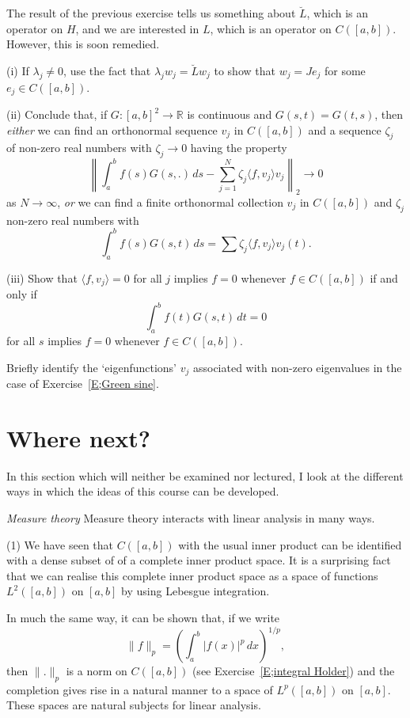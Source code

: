 The result of the previous exercise tells us something about $\breve{L}$,
which is an operator on $H$, and we are interested in $L$, 
which is an operator
on $C([a,b])$. However, this is soon remedied.
\begin{exercise}\label{D7} (i) If $\lambda_{j}\neq 0$, use the fact that
$\lambda_{j}w_{j}=\breve{L}w_{j}$ to show that $w_{j}=Je_{j}$
for some $e_{j}\in C([a,b])$.

(ii) Conclude that, if $G:[a,b]^{2}\rightarrow{\mathbb R}$
is continuous and $G(s,t)=G(t,s)$, then 
\emph{either} we can find an orthonormal
sequence $v_{j}$ in $C([a,b])$ and a sequence $\zeta_{j}$
of non-zero real numbers with $\zeta_{j}\rightarrow 0$
having the property
\[\left\|\int_{a}^{b}f(s)G(s,.)\,ds-\sum_{j=1}^{N}\zeta_{j}
\langle f,v_{j}\rangle v_{j}\right\|_{2}\rightarrow 0\]
as $N\rightarrow\infty$,
\emph{or} we can find a finite orthonormal collection
$v_{j}$ in $C([a,b])$ and $\zeta_{j}$
non-zero real numbers with
\[\int_{a}^{b}f(s)G(s,t)\,ds=\sum \zeta_{j}
\langle f,v_{j}\rangle v_{j}(t).\]

(iii) Show that $\langle f,v_{j}\rangle =0$ for all $j$ implies
$f=0$ whenever $f\in C([a,b])$
if and only if
\[\int_{a}^{b}f(t)G(s,t)\,dt=0\]
for all $s$ implies $f=0$ whenever $f\in C([a,b])$.
\end{exercise}
\begin{exercise}\label{D8} Briefly identify the `eigenfunctions'
$v_{j}$ associated with non-zero 
eigenvalues in the case of Exercise~\ref{E;Green sine}.
\end{exercise}
\section{Where next?} In this section which will neither be examined
nor lectured, I look at the different ways in which the ideas
of this course can be developed.

\noindent\emph{Measure theory} Measure theory interacts
with linear analysis in many ways. 

(1) We have seen that $C([a,b])$
with the usual inner product can be identified with a dense
subset of of a complete inner product space. It is a surprising
fact that we can realise this complete inner product space
as a space of functions $L^{2}([a,b])$ on $[a,b]$
by using Lebesgue integration. 

In much the same way, it can be shown
that, if we write
\[\|f\|_{p}=\left(\int_{a}^{b}|f(x)|^{p}\,dx\right)^{1/p},\]
then $\|.\|_{p}$ is a norm on $C([a,b])$ 
(see Exercise~\ref{E;integral Holder}) and the completion
gives rise in a natural manner to a space of
$L^{p}([a,b])$ on $[a,b]$. These spaces are natural subjects
for linear analysis.

